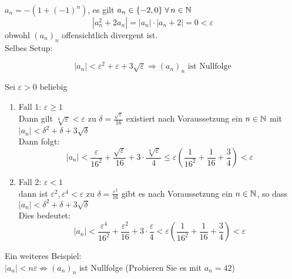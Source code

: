 \documentclass[../ana1u.tex]{subfiles}
\begin{document}
\begin{bsp}
    \(a_n = -(1 + (-1)^n)\), es gilt \(a_n \in \{-2, 0\} \; \forall \, n \in \mathbb{N}\)
    \[|a_n^2 + 2a_n| = |a_n| \cdot |a_n + 2| = 0 < \varepsilon\]
    obwohl \((a_n)_n\) offensichtlich divergent ist.\\
    Selbes Setup:
    \begin{beh}
        \[|a_n| < \varepsilon^2 + \varepsilon + 3\sqrt{\varepsilon} \Rightarrow (a_n)_n \text{ ist Nullfolge}\]
    \end{beh}
    \begin{bew}
        Sei \(\varepsilon > 0\) beliebig\\
        \begin{enumerate}
            \item Fall 1: \(\varepsilon \geq 1\)\\
                Dann gilt \(\sqrt[k]{\varepsilon} < \varepsilon\) zu \(\delta = \frac{\sqrt{\varepsilon}}{16}\) existiert nach Voraussetzung ein \(n \in \mathbb{N}\) mit \(|a_n| < \delta^2 + \delta + 3\sqrt{\delta}\)\\
                Dann folgt:
                \[|a_n| < \frac{\varepsilon}{16^2} + \frac{\sqrt{\varepsilon}}{16} + 3 \cdot \frac{\sqrt[4]{\varepsilon}}{4} \leq \varepsilon\left(\frac{1}{16^2} + \frac{1}{16} + \frac{3}{4}\right) < \varepsilon\]
            \item Fall 2: \(\varepsilon < 1\)\\
                dann ist \(\varepsilon^2, \varepsilon^4 < \varepsilon\) zu \(\delta = \frac{\varepsilon^2}{16}\) gibt es nach Voraussetzung ein \(n \in \mathbb{N}\), so dass \(|a_n| < \delta^2 + \delta + 3\sqrt{\delta}\)\\
                Dies bedeutet:
                \[|a_n| < \frac{\varepsilon^4}{16^2} + \frac{\varepsilon^2}{16} + 3 \cdot \frac{\varepsilon}{4} < \varepsilon\left(\frac{1}{16^2} + \frac{1}{16} + \frac{3}{4}\right) < \varepsilon\]
        \end{enumerate}
    \end{bew}
    Ein weiteres Beispiel:\\
    \(|a_n| < n\varepsilon \not \Rightarrow (a_n)_n\) ist Nullfolge (Probieren Sie es mit \(a_n = 42\))
\end{bsp}
\end{document}
